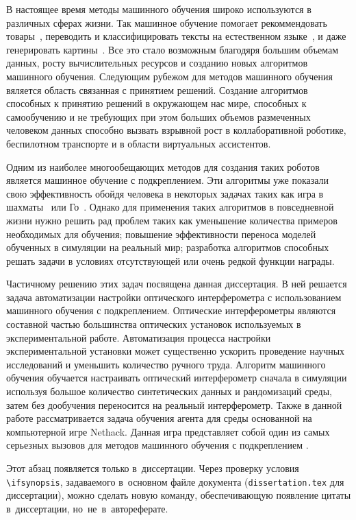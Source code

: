 
{\actuality} В настоящее время методы машинного обучения широко используются в различных сферах жизни. Так машинное обучение помогает рекоммендовать товары~\cite{recsys}, переводить и классифицировать тексты на естественном языке~\cite{attention_is_all_you_need, bert}, и даже генерировать картины~\cite{dall-e}. Все это стало возможным благодяря большим объемам данных, росту вычислительных ресурсов и созданию новых алгоритмов машинного обучения. Следующим рубежом для методов машинного обучения вяляется область связанная с принятием решений. Создание алгоритмов способных к принятию решений в окружающем нас мире, способных к самообучению и не требующих при этом больших объемов размеченных человеком данных способно вызвать взрывной рост в коллаборативной роботике, беспилотном транспорте и в области виртуальных ассистентов. 

Одним из наиболее многообещающих методов для создания таких роботов является машинное обучение с подкреплением. Эти алгоритмы уже показали свою эффективность обойдя человека в некоторых задачах таких как игра в шахматы~\cite{alphazero} или Го~\cite{alphago}. Однако для применения таких алгоритмов в повседневной жизни нужно решить рад проблем таких как уменьшение количества примеров необходимых для обучения; повышение эффективности переноса моделей обученных в симуляции на реальный мир; разработка алгоритмов способных решать задачи в условиях отсутствующей или очень редкой функции награды. 

Частичному решению этих задач посвящена данная диссертация. В ней решается задача автоматизации настройки оптического интерферометра с использованием машинного обучения с подкреплением. Оптические интерферометры являются составной частью большинства оптических установок используемых в экспериментальной работе. Автоматизация процесса настройки экспериментальной установки может существенно ускорить проведение научных исследований и уменьшить количество ручного труда. Алгоритм машинного обучения обучается настраивать оптический интерферометр сначала в симуляции используя большое количество синтетических данных и рандомизаций среды, затем без дообучения переносится на реальный интерферометр. Также в данной работе рассматривается задача обучения агента для среды основанной на компьютерной игре Nethack. Данная игра представляет собой один из самых серьезных вызовов для методов машинного обучения с подкреплением \cite{nethack}. 

\ifsynopsis
\else
Этот абзац появляется только в~диссертации.
Через проверку условия \verb!\!\verb!ifsynopsis!, задаваемого в~основном файле
документа (\verb!dissertation.tex! для диссертации), можно сделать новую
команду, обеспечивающую появление цитаты в~диссертации, но~не~в~автореферате.
\fi

